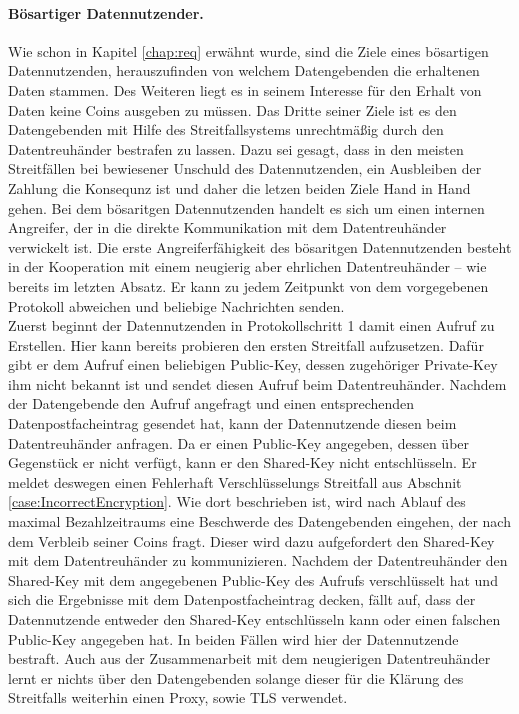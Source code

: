 \documentclass[
	fontsize=12pt,
	headings=small,
	parskip=half,           %
	bibliography=totoc,
	numbers=noenddot,       %
	open=any,               %
]{scrreprt}
\begin{document}
\paragraph{Bösartiger Datennutzender.}
Wie schon in Kapitel \ref{chap:req} erwähnt wurde, sind die Ziele eines bösartigen Datennutzenden, herauszufinden von welchem Datengebenden die erhaltenen Daten stammen. Des Weiteren liegt es in seinem Interesse für den Erhalt von Daten keine Coins ausgeben zu müssen. Das Dritte seiner Ziele ist es den Datengebenden mit Hilfe des Streitfallsystems unrechtmäßig durch den Datentreuhänder bestrafen zu lassen. Dazu sei gesagt, dass in den meisten Streitfällen bei bewiesener Unschuld des Datennutzenden, ein Ausbleiben der Zahlung die Konsequnz ist und daher die letzen beiden Ziele Hand in Hand gehen. Bei dem bösaritgen Datennutzenden handelt es sich um einen internen Angreifer, der in die direkte Kommunikation mit dem Datentreuhänder verwickelt ist. Die erste Angreiferfähigkeit des bösaritgen Datennutzenden besteht in der Kooperation mit einem neugierig aber ehrlichen Datentreuhänder -- wie bereits im letzten Absatz. Er kann zu jedem Zeitpunkt von dem vorgegebenen Protokoll abweichen und beliebige Nachrichten senden.\\

Zuerst beginnt der Datennutzenden in Protokollschritt 1 damit einen Aufruf zu Erstellen. Hier kann bereits probieren den ersten Streitfall aufzusetzen. Dafür gibt er dem Aufruf einen beliebigen Public-Key, dessen zugehöriger Private-Key ihm nicht bekannt ist und sendet diesen Aufruf beim Datentreuhänder. Nachdem der Datengebende den Aufruf angefragt und einen entsprechenden Datenpostfacheintrag gesendet hat, kann der Datennutzende diesen beim Datentreuhänder anfragen. Da er einen Public-Key angegeben, dessen über Gegenstück er nicht verfügt, kann er den Shared-Key nicht entschlüsseln. Er meldet deswegen einen Fehlerhaft Verschlüsselungs Streitfall aus Abschnit \ref{case:IncorrectEncryption}. Wie dort beschrieben ist, wird nach Ablauf des maximal Bezahlzeitraums eine Beschwerde des Datengebenden eingehen, der nach dem Verbleib seiner Coins fragt. Dieser wird dazu aufgefordert den Shared-Key mit dem Datentreuhänder zu kommunizieren. Nachdem der Datentreuhänder den Shared-Key mit dem angegebenen Public-Key des Aufrufs verschlüsselt hat und sich die Ergebnisse mit dem Datenpostfacheintrag decken, fällt auf, dass der Datennutzende entweder den Shared-Key entschlüsseln kann oder einen falschen Public-Key angegeben hat. In beiden Fällen wird hier der Datennutzende bestraft. Auch aus der Zusammenarbeit mit dem neugierigen Datentreuhänder lernt er nichts über den Datengebenden solange dieser für die Klärung des Streitfalls weiterhin einen Proxy, sowie TLS verwendet.\\
\end{document}
